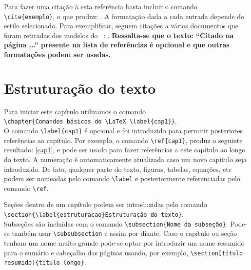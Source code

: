 Para fazer uma citação à esta referência basta incluir o comando \verb+\cite{exemplo}+, o que produz: \cite{exemplo}. A formatação dada
a cada entrada depende do estilo selecionado. Para exemplificar, seguem citações a vários documentos que foram retiradas dos modelos do
\abnTeX\ \cite{abntex2modelo}: \cite{guizzardi2005,macedo2005,EIA649B,masolo2010,guarino1995,bates2010,doxiadis1965}.
\textbf{Ressalta-se que o texto: ``Citado na página ...'' presente na lista de referências é opcional e que outras formatações podem
ser usadas.}

\newpage


\section{\label{estruturacao}Estruturação do texto}

Para iniciar este capítulo utilizamos o comando \\ \verb+\chapter{Comandos básicos do \LaTeX \label{cap1}}+.\\ O comando
\verb+\label{cap1}+ é opcional e foi introduzido para permitir posteriores referências ao capítulo. Por exemplo, o comando
\verb+\ref{cap1}+, produz o seguinte resultado: \ref{cap1}, e pode ser usado para fazer referências a este capítulo ao longo do texto.
A numeração é automaticamente atualizada caso um novo capítulo seja introduzido. De fato, qualquer parte do texto, figuras, tabelas,
equações, etc podem ser nomeadas pelo comando \verb+\label+ e posteriormente referenciadas pelo comando \verb+\ref+.

Seções dentro de um capítulo podem ser introduzidas pelo comando \\ \verb+\section{\label{estruturacao}Estruturação do texto}+. \\
Subseções são incluídas com o comando \verb+\subsection{Nome da subseção}+. Pode-se também usar \verb+\subsubsection+ e assim por
diante. Caso o capítulo ou seção tenham um nome muito grande pode-se optar por introduzir um  nome resumido para o sumário e cabeçalho
das páginas usando, por exemplo, \verb+\section[título resumido]{título longo}+.

